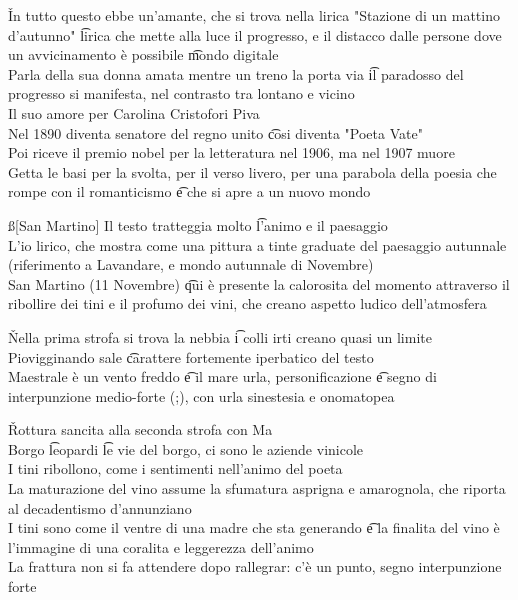\documentclass[12pt]{article}
\begin{document}
\v

In tutto questo ebbe un'amante, che si trova nella lirica "Stazione di un mattino d'autunno" \t lirica che mette alla luce il progresso, e il distacco dalle persone dove un avvicinamento è possibile \t mondo digitale \\
Parla della sua donna amata mentre un treno la porta via \t il paradosso del progresso si manifesta, nel contrasto tra lontano e vicino \\
Il suo amore per Carolina Cristofori Piva \\
Nel 1890 diventa senatore del regno unito \t cosi diventa "Poeta Vate" \\
Poi riceve il premio nobel per la letteratura nel 1906, ma nel 1907 muore \\
Getta le basi per la svolta, per il verso livero, per una parabola della poesia che rompe con il romanticismo \t e che si apre a un nuovo mondo

\ss[San Martino]
Il testo tratteggia molto \t l'animo e il paesaggio \\
L'io lirico, che mostra come una pittura a tinte graduate del paesaggio autunnale (riferimento a Lavandare, e mondo autunnale di Novembre) \\
San Martino (11 Novembre) \t qui è presente la calorosita del momento attraverso il ribollire dei tini e il profumo dei vini, che creano aspetto ludico dell'atmosfera

\v

Nella prima strofa si trova la nebbia \t i colli irti creano quasi un limite \\
Piovigginando sale \t carattere fortemente iperbatico del testo \\
Maestrale è un vento freddo \t e il mare urla, personificazione \t e segno di interpunzione medio-forte (;), con urla sinestesia e onomatopea 

\v

Rottura sancita alla seconda strofa con Ma \\
Borgo \t leopardi \t le vie del borgo, ci sono le aziende vinicole \\
I tini ribollono, come i sentimenti nell'animo del poeta \\
La maturazione del vino assume la sfumatura asprigna e amarognola, che riporta al decadentismo d'annunziano \\
I tini sono come il ventre di una madre che sta generando \t e la finalita del vino è l'immagine di una coralita e leggerezza dell'animo \\
La frattura non si fa attendere dopo rallegrar: c'è un punto, segno interpunzione forte
\end{document}

